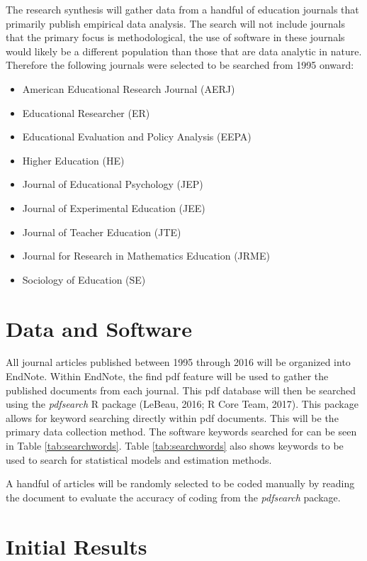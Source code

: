 \documentclass[english,man]{apa6}
\providecommand{\tightlist}{%
  \setlength{\itemsep}{0pt}\setlength{\parskip}{0pt}}
\theoremstyle{definition}
\theoremstyle{definition}
\theoremstyle{definition}
\theoremstyle{remark}
\begin{document}
The research synthesis will gather data from a handful of education
journals that primarily publish empirical data analysis. The search will
not include journals that the primary focus is methodological, the use
of software in these journals would likely be a different population
than those that are data analytic in nature. Therefore the following
journals were selected to be searched from 1995 onward:

\begin{itemize}
\tightlist
\item
  American Educational Research Journal (AERJ)
\item
  Educational Researcher (ER)
\item
  Educational Evaluation and Policy Analysis (EEPA)
\item
  Higher Education (HE)
\item
  Journal of Educational Psychology (JEP)
\item
  Journal of Experimental Education (JEE)
\item
  Journal of Teacher Education (JTE)
\item
  Journal for Research in Mathematics Education (JRME)
\item
  Sociology of Education (SE)
\end{itemize}

\hypertarget{data-and-software}{%
\section{Data and Software}\label{data-and-software}}

All journal articles published between 1995 through 2016 will be
organized into EndNote. Within EndNote, the find pdf feature will be
used to gather the published documents from each journal. This pdf
database will then be searched using the \emph{pdfsearch} R package
(LeBeau, 2016; R Core Team, 2017). This package allows for keyword
searching directly within pdf documents. This will be the primary data
collection method. The software keywords searched for can be seen in
Table \ref{tab:searchwords}. Table \ref{tab:searchwords} also shows
keywords to be used to search for statistical models and estimation
methods.

A handful of articles will be randomly selected to be coded manually by
reading the document to evaluate the accuracy of coding from the
\emph{pdfsearch} package.

\hypertarget{initial-results}{%
\section{Initial Results}\label{initial-results}}
\end{document}
